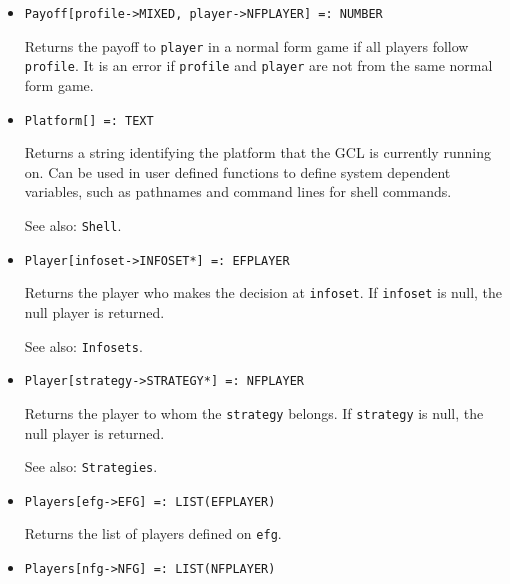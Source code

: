 \begin{itemize}
\item{}
\protect \large \begin{verbatim}
Payoff[profile->MIXED, player->NFPLAYER] =: NUMBER 
\end{verbatim}\normalsize

\bd
Returns the payoff to \verb+player+ in a normal form game if all players
follow \verb+profile+.  It is an error if \verb+profile+ and \verb+player+
are not from the same normal form game.
\ed

\item{}
\protect \large \begin{verbatim}
Platform[] =: TEXT 
\end{verbatim} \normalsize

\bd 
Returns a string identifying the platform that the GCL is
currently running on.  Can be used in user defined functions to define
system dependent variables, such as pathnames and command lines for
shell commands.  
\item [See also:] \verb+Shell+.
\ed

\item{}
\protect \large \begin{verbatim}
Player[infoset->INFOSET*] =: EFPLAYER 
\end{verbatim}\normalsize

\bd
Returns the player who makes the decision at \verb+infoset+.
If \verb+infoset+ is null, the null player is returned.
\item [See also:] \verb+Infosets+.
\ed

\item{}
\protect \large \begin{verbatim}
Player[strategy->STRATEGY*] =: NFPLAYER 
\end{verbatim}\normalsize

\bd
Returns the player to whom the \verb+strategy+ belongs.
If \verb+strategy+ is null, the null player is returned.
\item [See also:] \verb+Strategies+.
\ed

\item{}
\protect \large \begin{verbatim}
Players[efg->EFG] =: LIST(EFPLAYER) 
\end{verbatim} \normalsize

\bd
Returns the list of players defined on \verb+efg+.
\ed

\item{}
\protect \large \begin{verbatim}
Players[nfg->NFG] =: LIST(NFPLAYER) 
\end{verbatim} \normalsize


\end{itemize}
